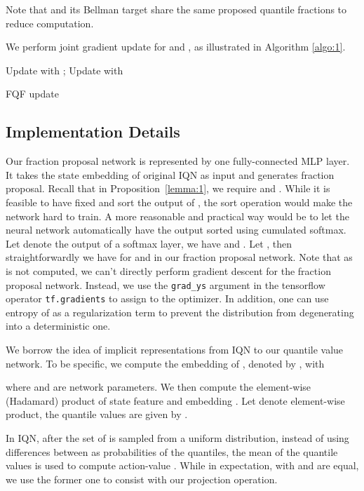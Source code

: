 \documentclass{article}
\begin{document}
Note that  and its Bellman target share the same proposed quantile fractions  to reduce computation.


We perform joint gradient update for  and , as illustrated in Algorithm \ref{algo:1}.

\begin{algorithm}[H]
\SetAlgoLined
\label{algo:1}
\KwParameter{}
\KwInput{}
 \;
 \For {}{
  \; }
 \;
 \; 
 \For {}{
    \For {}{
        
    }
 }
 \;
 \;
 Update  with ; Update  with \;
 \KwOutput{}
\caption{FQF update}
\end{algorithm}



\subsection{Implementation Details}
Our fraction proposal network is represented by one fully-connected MLP layer. It takes the state embedding of original IQN as input and generates fraction proposal. Recall that in Proposition~\ref{lemma:1}, we require  and . While it is feasible to have  fixed and sort the output of , the sort operation would make the network hard to train. A more reasonable and practical way would be to let the neural network automatically have the output sorted using cumulated softmax. Let  denote the output of a softmax layer, we have  and . Let , then straightforwardly we have  for  and  in our fraction proposal network. Note that as  is not computed, we can't directly perform gradient descent for the fraction proposal network. Instead, we use the \verb|grad_ys| argument in the tensorflow operator \verb|tf.gradients| to assign  to the optimizer. In addition, one can use entropy of  as a regularization term  to prevent the distribution from degenerating into a deterministic one.

We borrow the idea of implicit representations from IQN to our quantile value network. To be specific, we compute the embedding of , denoted by , with 

where  and  are network parameters. We then compute the element-wise (Hadamard) product of state feature  and embedding . Let  denote element-wise product, the quantile values are given by .

In IQN, after the set of  is sampled from a uniform distribution, instead of using differences between  as probabilities of the quantiles, the mean of the quantile values is used to compute action-value . While in expectation,  with  and  are equal, we use the former one to consist with our projection operation.
\end{document}
